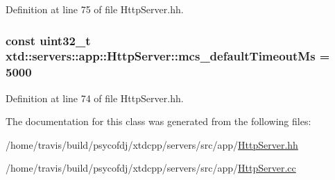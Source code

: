 Definition at line 75 of file Http\-Server.\-hh.

\hypertarget{classxtd_1_1servers_1_1app_1_1HttpServer_abdc02697ffc7fa9f8f88252101b5d1b9}{
\subsubsection[{mcs\-\_\-default\-Timeout\-Ms}]{\setlength{\rightskip}{0pt plus 5cm}const uint32\-\_\-t xtd\-::servers\-::app\-::\-Http\-Server\-::mcs\-\_\-default\-Timeout\-Ms = 5000\hspace{0.3cm}{\ttfamily [static]}}}\label{classxtd_1_1servers_1_1app_1_1HttpServer_abdc02697ffc7fa9f8f88252101b5d1b9}


Definition at line 74 of file Http\-Server.\-hh.



The documentation for this class was generated from the following files\-:\begin{DoxyCompactItemize}
\item 
/home/travis/build/psycofdj/xtdcpp/servers/src/app/\hyperlink{HttpServer_8hh}{Http\-Server.\-hh}\item 
/home/travis/build/psycofdj/xtdcpp/servers/src/app/\hyperlink{HttpServer_8cc}{Http\-Server.\-cc}\end{DoxyCompactItemize}
